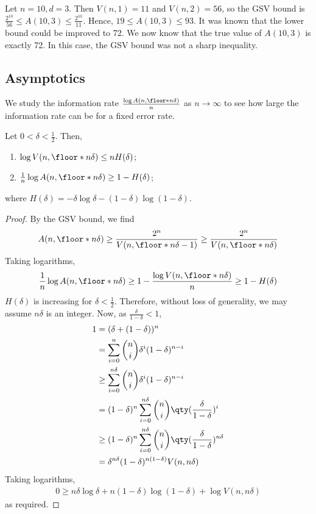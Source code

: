 \begin{example}
    Let $n = 10, d = 3$.
    Then $V(n,1) = 11$ and $V(n,2) = 56$, so the GSV bound is $\frac{2^{10}}{56} \leq A(10,3) \leq \frac{2^{10}}{11}$.
    Hence, $19 \leq A(10,3) \leq 93$.
    It was known that the lower bound could be improved to 72.
    We now know that the true value of $A(10,3)$ is exactly 72.
    In this case, the GSV bound was not a sharp inequality.
\end{example}

\subsection{Asymptotics}
We study the information rate $\frac{\log A(n,\floor*{n\delta})}{n}$ as $n \to \infty$ to see how large the information rate can be for a fixed error rate.
\begin{proposition}
    Let $0 < \delta < \frac{1}{2}$.
    Then,
    \begin{enumerate}
        \item $\log V(n,\floor*{n\delta}) \leq nH(\delta)$;
        \item $\frac{1}{n} \log A(n,\floor*{n\delta}) \geq 1 - H(\delta)$;
    \end{enumerate}
    where $H(\delta) = -\delta \log \delta - (1-\delta)\log (1-\delta)$.
\end{proposition}
\begin{proof}
    By the GSV bound, we find
    \begin{align*}
        A(n,\floor*{n\delta}) \geq \frac{2^n}{V(n,\floor*{n\delta} - 1)} \geq \frac{2^n}{V(n,\floor*{n\delta})}
    \end{align*}
    Taking logarithms,
    \begin{align*}
        \frac{1}{n}\log A(n,\floor*{n\delta}) \geq 1 - \frac{\log V(n,\floor*{n\delta})}{n} \geq 1 - H(\delta)
    \end{align*}
    $H(\delta)$ is increasing for $\delta < \frac{1}{2}$.
    Therefore, without loss of generality, we may assume $n\delta$ is an integer.
    Now, as $\frac{\delta}{1-\delta} < 1$,
    \begin{align*}
        1 &= (\delta + (1-\delta))^n \\
        &= \sum_{i=0}^n \binom{n}{i} \delta^i (1-\delta)^{n-i} \\
        &\geq \sum_{i=0}^{n\delta} \binom{n}{i} \delta^i (1-\delta)^{n-i} \\
        &= (1-\delta)^n \sum_{i=0}^{n\delta} \binom{n}{i} \qty(\frac{\delta}{1-\delta})^i \\
        &\geq (1-\delta)^n \sum_{i=0}^{n\delta} \binom{n}{i} \qty(\frac{\delta}{1-\delta})^{n\delta} \\
        &= \delta^{n\delta} (1-\delta)^{n(1-\delta)} V(n,n\delta)
    \end{align*}
    Taking logarithms,
    \begin{align*}
        0 \geq n\delta \log \delta + n(1-\delta) \log(1-\delta) + \log V(n,n\delta)
    \end{align*}
    as required.
\end{proof}
